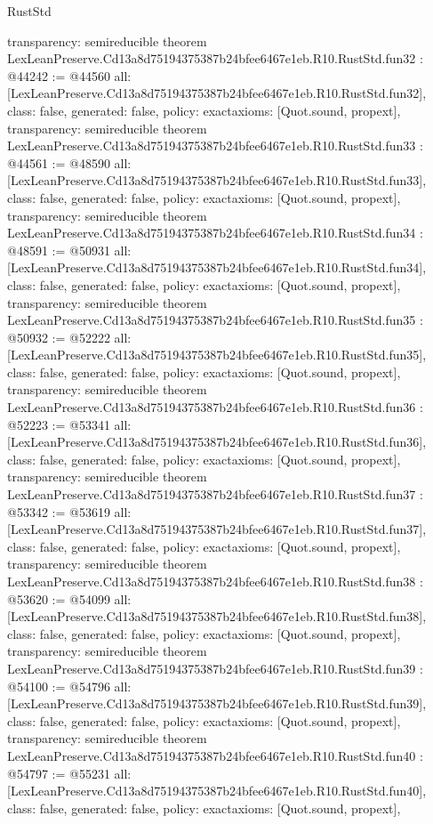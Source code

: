 \begin{lexlean}{RustStd}
\begin{coremodule}
{  transparency: semireducible
}
theorem LexLeanPreserve.Cd13a8d75194375387b24bfee6467e1eb.R10.RustStd.fun32 : @44242 := @44560 {
  all: [LexLeanPreserve.Cd13a8d75194375387b24bfee6467e1eb.R10.RustStd.fun32],
  class: false,
  generated: false,
  policy: exact{axioms: [Quot.sound, propext]},
  transparency: semireducible
}
theorem LexLeanPreserve.Cd13a8d75194375387b24bfee6467e1eb.R10.RustStd.fun33 : @44561 := @48590 {
  all: [LexLeanPreserve.Cd13a8d75194375387b24bfee6467e1eb.R10.RustStd.fun33],
  class: false,
  generated: false,
  policy: exact{axioms: [Quot.sound, propext]},
  transparency: semireducible
}
theorem LexLeanPreserve.Cd13a8d75194375387b24bfee6467e1eb.R10.RustStd.fun34 : @48591 := @50931 {
  all: [LexLeanPreserve.Cd13a8d75194375387b24bfee6467e1eb.R10.RustStd.fun34],
  class: false,
  generated: false,
  policy: exact{axioms: [Quot.sound, propext]},
  transparency: semireducible
}
theorem LexLeanPreserve.Cd13a8d75194375387b24bfee6467e1eb.R10.RustStd.fun35 : @50932 := @52222 {
  all: [LexLeanPreserve.Cd13a8d75194375387b24bfee6467e1eb.R10.RustStd.fun35],
  class: false,
  generated: false,
  policy: exact{axioms: [Quot.sound, propext]},
  transparency: semireducible
}
theorem LexLeanPreserve.Cd13a8d75194375387b24bfee6467e1eb.R10.RustStd.fun36 : @52223 := @53341 {
  all: [LexLeanPreserve.Cd13a8d75194375387b24bfee6467e1eb.R10.RustStd.fun36],
  class: false,
  generated: false,
  policy: exact{axioms: [Quot.sound, propext]},
  transparency: semireducible
}
theorem LexLeanPreserve.Cd13a8d75194375387b24bfee6467e1eb.R10.RustStd.fun37 : @53342 := @53619 {
  all: [LexLeanPreserve.Cd13a8d75194375387b24bfee6467e1eb.R10.RustStd.fun37],
  class: false,
  generated: false,
  policy: exact{axioms: [Quot.sound, propext]},
  transparency: semireducible
}
theorem LexLeanPreserve.Cd13a8d75194375387b24bfee6467e1eb.R10.RustStd.fun38 : @53620 := @54099 {
  all: [LexLeanPreserve.Cd13a8d75194375387b24bfee6467e1eb.R10.RustStd.fun38],
  class: false,
  generated: false,
  policy: exact{axioms: [Quot.sound, propext]},
  transparency: semireducible
}
theorem LexLeanPreserve.Cd13a8d75194375387b24bfee6467e1eb.R10.RustStd.fun39 : @54100 := @54796 {
  all: [LexLeanPreserve.Cd13a8d75194375387b24bfee6467e1eb.R10.RustStd.fun39],
  class: false,
  generated: false,
  policy: exact{axioms: [Quot.sound, propext]},
  transparency: semireducible
}
theorem LexLeanPreserve.Cd13a8d75194375387b24bfee6467e1eb.R10.RustStd.fun40 : @54797 := @55231 {
  all: [LexLeanPreserve.Cd13a8d75194375387b24bfee6467e1eb.R10.RustStd.fun40],
  class: false,
  generated: false,
  policy: exact{axioms: [Quot.sound, propext]},
}
\end{coremodule}
\end{lexlean}
